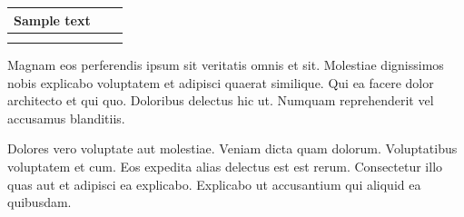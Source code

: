 \documentclass{article}
\begin{document}
\begin{table}[h]
    \begin{tabular}{|l|l|l|}
    \hline
    Sample text &  &  \\ \hline
     &  &  \\ \hline
     &  &  \\ \hline
    \end{tabular}
    \end{table}

Magnam eos perferendis ipsum sit veritatis omnis et sit. Molestiae dignissimos nobis explicabo voluptatem et adipisci quaerat similique. Qui ea facere dolor architecto et qui quo. Doloribus delectus hic ut. Numquam reprehenderit vel accusamus blanditiis.

Dolores vero voluptate aut molestiae. Veniam dicta quam dolorum. Voluptatibus voluptatem et cum. Eos expedita alias delectus est est rerum. Consectetur illo quas aut et adipisci ea explicabo. Explicabo ut accusantium qui aliquid ea quibusdam.
\end{document}
